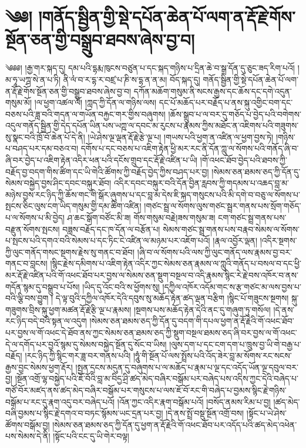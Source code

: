 \setcounter{footnote}{0} 
\chapter{༄༅། །གནོད་སྦྱིན་གྱི་སྡེ་དཔོན་ཆེན་པོ་ལག་ན་རྡོ་རྗེ་གོས་སྔོན་ཅན་གྱི་བསྒྲུབ་ཐབས་ཞེས་བྱ་བ།}༄༅༅། །རྒྱ་གར་སྐད་དུ། དམ་པའི་དྷརྨ་ཁུངས་བཙུན་པ་དང་སྐད་གཉིས་པ་དྲིན་ཆེ་བ་སྒྲ་དོན་དུ་ཅུང་ཟད་རིག་པའོ། །མ་ཧཱ་ཡཀྴ་སེ་ན་པ་ཏི། ནི་ལཾ་བ་ར་དྷ་ར་བཛྲ་པ་ཎི་ས་དྷ་ན་ན་མ། བོད་སྐད་དུ། གནོད་སྦྱིན་གྱི་སྡེ་དཔོན་ཆེན་པོ་ལག་ན་རྡོ་རྗེ་གོས་སྔོན་ཅན་གྱི་བསྒྲུབ་ཐབས་ཞེས་བྱ་བ། དཀོན་མཆོག་གསུམ་ནི་སངས་རྒྱས་དང་ཆོས་དང་དགེ་འདུན་གསུམ་མོ། །ལ་ཕྱག་འཚལ་ལོ། །ཀླད་ཀྱི་དོན་ལ་གཉིས་ལས། དང་པོ་མཆོད་པར་བརྗོད་པ་ནས་སྐུ་འགྱིང་བག་དང་བཅས་པའི་ཟླ་བའི་གདན་ལ་གཡོན་བརྐྱང་གར་གྱིས་བཞུགས། །ཆོས་སྒྲུབ་པ་ལ་བར་དུ་གཅོད་པ་བྱེད་པའི་བགེགས་འདུལ་གནོད་སྦྱིན་གྱི་དེད་དཔོན་ཡིན་པས་ཡཀྵ་ལ་དབང་མ་རུངས་པ་རྣམས་ཀྱིས་མཐོང་ན་འཇིགས་པའི་གཟུགས་སུ་སྣང་བའི་ཁྲོ་བོ་ཆེན་པོ་དེ་ནི། །ཡེ་ཤེས་ལྔ་ལྡན་རྡོ་རྗེ་རྩེ་ལྔ་པ། །གཡས་པའི་ཕྱག་ན་འཛིན་ལ་ཕྱག་བྱས་ཏེ། །གཉིས་པ་བཤད་པར་དམ་བཅའ་བ། དགོས་པ་དང་བཅས་པ་འཇིག་རྟེན་ཕྱི་མར་རང་ནི་དོན་ཀླུ་ལ་སོགས་པའི་གནོད་ཞི་བ་ཞི་བར་བྱེད་པ་འཇིག་རྟེན་འདིར་ཕན་པའི་དངོས་གྲུབ་དང་རྡོ་རྗེ་འཛིན་པ་ཡི། །གོ་འཕང་ཐོབ་བྱེད་པའི་ཐབས་ཀྱི་བརྗོད་བྱ་བདག་གིས་ཚིག་དང་ཡི་གེའི་ཚོགས་ཀྱི་བརྗོད་བྱེད་ཀྱིས་བཤད་པར་བྱ། །སེམས་ཅན་ཐམས་ཅད་ཀྱི་དོན་དུ་སེམས་བསྐྱེད་བྱས་ཤིང་དབང་བསྐུར་ཐོབ། འདིར་དབང་བསྐུར་བའི་དོན་བྱིན་རླབས་ཀྱི་གདམས་པ་འཆད་བླ་མ་མཉེས་བྱས་རང་ཉིད་ཀྱི་ཆོས་གང་གི་སྒོར་ཞུགས་པ་དང་བླ་མ་དེས་ཇི་སྐད་གསུངས་པའི་མི་དགེ་བ་བཅུ་ལ་སོགས་པ་སྤངས་ཅིང་ལུས་ངག་ཡིད་གསུམ་གྱི་དམ་ཚིག་འཛིན། །གཙང་སྦྲ་ལ་སོགས་ལུས་གཙང་སྦྲར་གནས་པས་སྲོག་གཅོད་པ་ལ་སོགས་པ་མི་བྱེད། ཤ་ཆང་སྒོག་བཙོང་མི་ཟ། གོས་གསུམ་བརྗེ།ཟས་གསུམ་ཟ། ངག་གཙང་སྦྲ་གནས་པས་བརྫུན་སོགས་སྤངས། བཟླས་བརྗོད་དང་ཁ་དོན་ལ་བརྩོན་པ། སེམས་གཙང་སྦྲ་གནས་པས་བརྣབ་སེམས་ལ་སོགས་པ་སྤངས་པའི་དགའ་བའི་སེམས་པ་དང་ཏིང་ངེ་འཛིན་ལ་མཉམ་པར་འཇོག་པའོ། །རྣལ་འབྱོར་ལྡན། །འདིར་སྔགས་ཀྱི་ལུང་གནོད་གསང་སྔགས་རྗེས་སུ་གནང་བ་ཐོབ། །ཞི་བ་ལ་སོགས་པའི་ལས་ཀྱི་ལུང་གནོད་ལས་རྣམས་བྱ་བར་གནང་བ་བླངས། །སྙིང་རྗེས་དམིགས་པ་འཇིག་རྟེན་འདིར་ཀྱང་སེམས་ཅན་རྣམས་ལ་ཀླུའི་གནོད་པ་བསལ་བ་དང་ཕྱི་མར་རྡོ་རྗེ་འཛིན་པའི་གོ་འཕང་ཐོབ་པར་བྱས་ལ་སེམས་ཅན་སྡུག་བསྔལ་བ་འདི་རྣམས་སྙིང་རེ་རྗེ་བས་འཁོར་བ་ནས་གདོན་སྙམ་དུ་བསྒྲུབ་པ་པོས། །ཡིད་དུ་འོང་བའི་ས་ཕྱོགས་སུ། །དཀྱིལ་འཁོར་འདོམ་གང་ས་རྩ་གཙང་མ་ལས་བྱས་པ་བའི་ལྕི་བས་བྱུག ། དེ་ལྟ་བུའི་དཀྱིལ་འཁོར་དེའི་དབུས་སུ་མཆོད་རྟེན་ཚད་ལྡན་བརྩིག །སྙིང་པོ་གཟུངས་སྔགས། སྐུ་གཟུགས་བྲིས་སྐུ་ཕྱག་མཚན་རྡོ་རྗེ་རྩི་ལྔ་པ་རྣམས། །སྔགས་པས་མཆོད་རྟེན་དེའི་ནང་དུ་གཞུག་ཏུ་གསོལ། །དེ་ནས་རང་ཉིད་བདེ་བའི་སྟན་ལ་འདུག །སེམས་ཅན་ཐམས་ཅད་ཀྱི་དོན་དུ་བདག་གི་དཔལ་ཕྱག་ན་རྡོ་རྗེའི་གོ་འཕང་ཐོབ་པར་བྱས་ལ་གོ་འཕང་དེ་ཐོབ་ནས་ཀྱང་སེམས་ཅན་ཐམས་ཅད་ཀྱི་སྡུག་བསྔལ་ཐམས་ཅད་ཞི་བར་བྱས་ལ་གོ་འཕང་དེ་ལ་དགོད་པར་བྱའོ་སྙམ་དུ་སེམས་བསྐྱེད་སྔོན་དུ་སོང་བ་ཡིས། །ལུས་དག་པ་དང་ངག་དག་པ་ཁྲུས་བྱ་ཡི་གེ་བརྒྱ་པ་བརྗོད། །རང་ཉིད་ཀྱི་སྙིང་གར་ཟླ་བར་གནས་པའི། །ཧཱུཾ་གི་སྔོན་པོ་ལས་སྤྲོས་པའི་འོད་ཟེར་བླ་མ་སོགས་རང་སངས་རྒྱས་བྱང་སེམས་ཕྱག་རྡོར། །སྤྱན་དྲངས་མདུན་དུ་བཞུགས་པ་ལ་མཆོད་པ་རྣམ་པ་ལྔ་དང་འདོད་ཡོན་ལྔ་དབུལ་བར་བྱ། །སྔོན་འགྲོ་ལྷ་བསྐྱེད་པའི་ཇོ་བོའི་བླ་མ་བིདྱ་ཤྲི་ཚད་མེད་བཞིར་བསྒོམ་པར་བཞེད་པས་འདིས་ཀྱང་དེའི་བཞེད་པ་གཙོ་བོར་མཛད་ནས་ཚད་མེད་བཞིར་བསྒོམ་པར་གསུངས་པ་ལས་ཇོ་བོ་རང་གི་བཞེད་པ་བྱམས་སྙིང་རྗེ་གཉིས་བསྒོམ་པ་རང་དུ་རྣག་འདུ་བར་བཞེད་པའོ། །འོན་ཀྱང་འདིར་རྣག་བསྒོམ་པའོ། །བསོད་ནམས་རིམ་པ་བྱ། །ཚད་མེད་བཞི་བྱམས་པ་སྙིང་རྗེ་དགའ་བ་བཏང་སྙོམས་ཡང་དྲན་པར་བྱ། །དེ་ནས་སྤྲོ་བསྡུ་སྔོན་འགྲོ་བས། །སྟོང་པ་ཡེ་ཤེས་ཚོགས་བསྒོམ་བྱ། །སེམས་ཅན་ཐམས་ཅད་ཀྱི་དོན་དུ་ཕྱག་ན་རྡོ་རྗེའི་གོ་འཕང་ཐོབ་པར་འདོད་པའི་ཚད་མེད་འཕེན་པས་སེམས་དེ་ནི། །སྟོང་པའི་ངང་དུ་ཡི་གེར་བལྟ། 